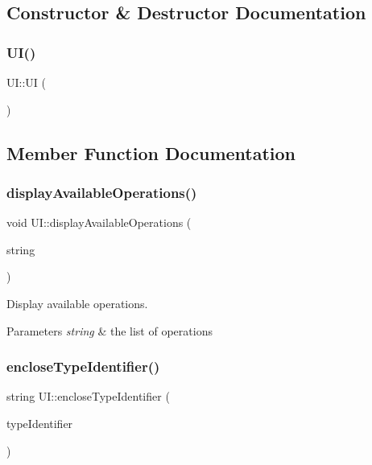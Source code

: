 \subsection{Constructor \& Destructor Documentation}
\mbox{\label{classUI_a675985a56b5e87ebdc8e5884b9f2ee09}} 
\subsubsection{\texorpdfstring{U\+I()}{UI()}}
{\footnotesize\ttfamily U\+I\+::\+UI (\begin{DoxyParamCaption}{ }\end{DoxyParamCaption})}



\subsection{Member Function Documentation}
\mbox{\label{classUI_abf905b724c7da571a7aa7b8e1a61e409}} 
\subsubsection{\texorpdfstring{display\+Available\+Operations()}{displayAvailableOperations()}}
{\footnotesize\ttfamily void U\+I\+::display\+Available\+Operations (\begin{DoxyParamCaption}\item[{string}]{string }\end{DoxyParamCaption})\hspace{0.3cm}{\ttfamily [private]}}

Display available operations. 
\begin{DoxyParams}{Parameters}
{\em string} & the list of operations \\
\hline
\end{DoxyParams}
\mbox{\label{classUI_a11fde47951c6781036418b9b2dd282ff}} 
\subsubsection{\texorpdfstring{enclose\+Type\+Identifier()}{encloseTypeIdentifier()}}
{\footnotesize\ttfamily string U\+I\+::enclose\+Type\+Identifier (\begin{DoxyParamCaption}\item[{string}]{type\+Identifier }\end{DoxyParamCaption})\hspace{0.3cm}{\ttfamily [private]}}

